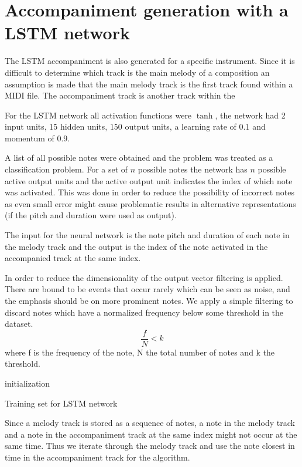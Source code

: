 \chapter{Accompaniment generation with a LSTM network} \label{ch:accomp_lstm}
The LSTM accompaniment is also generated for a specific instrument. 
Since it is difficult to determine which track is the main melody of a composition an assumption is made that the main melody track is the first track found within a MIDI file. The accompaniment track is another track within the 

For the LSTM network all activation functions were $\tanh$, the network had 2 input units, 15 hidden units, $150$ output units, a learning rate of $0.1$ and momentum of $0.9$.

A list of all possible notes were obtained and the problem was treated as a classification problem. For a set of $n$ possible notes the network has $n$ possible active output units and the active output unit indicates the index of which note was activated. This was done in order to reduce the possibility of incorrect notes as even small error might cause problematic results in alternative representations (if the pitch and duration were used as output).

The input for the neural network is the note pitch and duration of each note in the melody track and the output is the index of the note activated in the accompanied track at the same index.

In order to reduce the dimensionality of the output vector filtering is applied. There are bound to be events that occur rarely which can be seen as noise, and the emphasis should be on more prominent notes.
We apply a simple filtering to discard notes which have a normalized frequency below some threshold in the dataset.
\[ \frac{f}{N} < k \]
where f is the frequency of the note, N the total number of notes and k the threshold.

\begin{algorithm}
 initialization\;
 
\caption{Training set for LSTM network}
\end{algorithm}
Since a melody track is stored as a sequence of notes, a note in the melody track and a note in the accompaniment track at the same index might not occur at the same time. Thus we iterate through the melody track and use the note closest in time in the accompaniment track for the algorithm.

